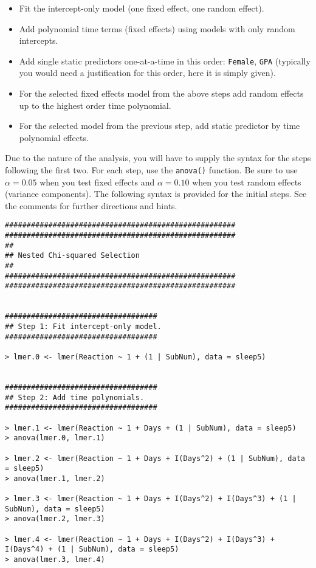 \documentclass[]{article}
\begin{document}
\begin{itemize}
\item Fit the intercept-only model (one fixed effect, one random effect).
\item Add polynomial time terms (fixed effects) using models with only random intercepts.
\item Add single static predictors one-at-a-time in this order: \texttt{Female}, \texttt{GPA} (typically you would need a justification for this order, here it is simply given).
\item For the selected fixed effects model from the above steps add random effects up to the highest order time polynomial.
\item For the selected model from the previous step, add static predictor by time polynomial effects.
\end{itemize}      

Due to the nature of the analysis, you will have to supply the syntax for the steps following the first two. For each step, use the \texttt{anova()} function.  Be sure to use $\alpha=0.05$ when you test fixed effects and $\alpha=0.10$ when you test random effects (variance components). The following syntax is provided for the initial steps. See the comments for further directions and hints.

\begin{shaded}
\begin{lstlisting}
#####################################################
#####################################################
##
## Nested Chi-squared Selection
##
#####################################################
#####################################################


###################################
## Step 1: Fit intercept-only model.
###################################

> lmer.0 <- lmer(Reaction ~ 1 + (1 | SubNum), data = sleep5)


###################################
## Step 2: Add time polynomials.
###################################

> lmer.1 <- lmer(Reaction ~ 1 + Days + (1 | SubNum), data = sleep5)
> anova(lmer.0, lmer.1)

> lmer.2 <- lmer(Reaction ~ 1 + Days + I(Days^2) + (1 | SubNum), data = sleep5)
> anova(lmer.1, lmer.2)

> lmer.3 <- lmer(Reaction ~ 1 + Days + I(Days^2) + I(Days^3) + (1 | SubNum), data = sleep5)
> anova(lmer.2, lmer.3)

> lmer.4 <- lmer(Reaction ~ 1 + Days + I(Days^2) + I(Days^3) + I(Days^4) + (1 | SubNum), data = sleep5)
> anova(lmer.3, lmer.4)
\end{lstlisting}
\end{shaded}
\end{document}
